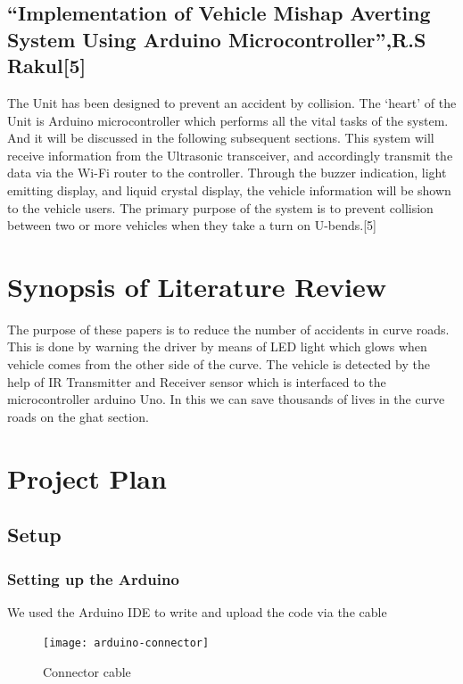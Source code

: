 \documentclass[conference]{IEEEtran}
\begin{document}
    \subsection{“Implementation of Vehicle Mishap Averting System Using Arduino Microcontroller”,R.S Rakul[5]}
    The Unit has been designed to prevent an accident by collision. The ‘heart' of the Unit is
    Arduino microcontroller which performs all the vital tasks of the system. And it will be discussed in the
    following subsequent sections. This system will receive information from the Ultrasonic transceiver, and
    accordingly transmit the data via the Wi-Fi router to the controller. Through the buzzer indication, light
    emitting display, and liquid crystal display, the vehicle information will be shown to the vehicle users. The
    primary purpose of the system is to prevent collision between two or more vehicles when they take a turn on
    U-bends.[5]

    \section{Synopsis of Literature Review}
    The purpose of these papers is to reduce the number of
    accidents in curve roads. This is done by warning the driver
    by means of LED light which glows when vehicle comes from
    the other side of the curve. The vehicle is detected by the
    help of IR Transmitter and Receiver sensor which is
    interfaced to the microcontroller arduino Uno. In this we can
    save thousands of lives in the curve roads on the ghat
    section.

    \section{Project Plan}

    \subsection{Setup}
    \subsubsection{Setting up the Arduino}
    We used the Arduino IDE to write and upload the code via the cable
    \begin{figure}[htbp]
        \centerline{\texttt{[image: arduino-connector]}}
        \caption{Connector cable}
        \label{fig}
    \end{figure}
\end{document}
